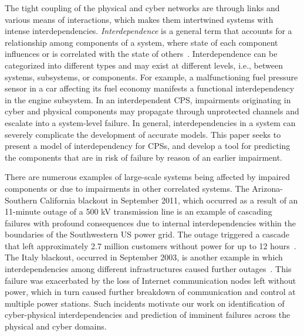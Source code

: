 \documentclass[12pt]{elsarticle}
\begin{document}
The tight coupling of the physical and cyber networks are through links and various means of interactions, which makes them intertwined systems with intense interdependencies. \emph{Interdependence} is a general term that accounts for a relationship among components of a system, where state of each component influences or is correlated with the state of others~\cite{RiP01}. Interdependence can be categorized into different types and may exist at different levels, i.e., between systems, subsystems, or components. For example, a malfunctioning fuel pressure sensor in a car affecting its fuel economy manifests a functional interdependency in the engine subsystem. In an interdependent CPS, impairments originating in cyber and physical components may propagate through unprotected channels and escalate into a system-level failure. In general, interdependencies in a system can severely complicate the development of accurate models. This paper seeks to present a model of interdependency for CPSs, and develop a tool for predicting the components that are in risk of failure by reason of an earlier impairment.

There are numerous examples of large-scale systems being affected by impaired components or due to impairments in other correlated systems. The Arizona-Southern California blackout in September 2011, which occurred as a result of an 11-minute outage of a 500 kV transmission line is an example of cascading failures with profound consequences due to internal interdependencies within the boundaries of the Southwestern US power grid. The outage triggered a cascade that left approximately 2.7 million customers without power for up to 12 hours~\cite{FERC12}. The Italy blackout, occurred in September 2003, is another example in which interdependencies among different infrastructures caused further outages~\cite{BeA04}. This failure was exacerbated by the loss of Internet communication nodes left without power, which in turn caused further breakdown of communication and control at multiple power stations. Such incidents motivate our work on identification of cyber-physical interdependencies and prediction of imminent failures across the physical and cyber domains.
\end{document}
